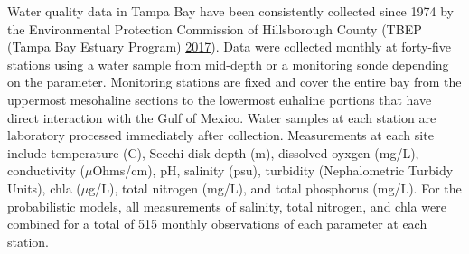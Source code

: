 \documentclass[]{article}
\begin{document}
Water quality data in Tampa Bay have been consistently collected since
1974 by the Environmental Protection Commission of Hillsborough County
(TBEP (Tampa Bay Estuary Program) \protect\hyperlink{ref-TBEP17}{2017}).
Data were collected monthly at forty-five stations using a water sample
from mid-depth or a monitoring sonde depending on the parameter.
Monitoring stations are fixed and cover the entire bay from the
uppermost mesohaline sections to the lowermost euhaline portions that
have direct interaction with the Gulf of Mexico. Water samples at each
station are laboratory processed immediately after collection.
Measurements at each site include temperature (C), Secchi disk depth
(m), dissolved oyxgen (mg/L), conductivity (\(\mu\)Ohms/cm), pH,
salinity (psu), turbidity (Nephalometric Turbidy Units), \ac{chla}
(\(\mu\)g/L), total nitrogen (mg/L), and total phosphorus (mg/L). For
the probabilistic models, all measurements of salinity, total nitrogen,
and \ac{chla} were combined for a total of 515 monthly observations of
each parameter at each station.
\end{document}
